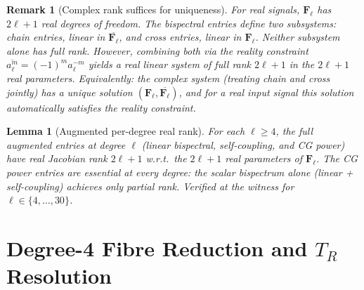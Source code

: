 \documentclass[11pt]{article}
\newtheorem{lemma}[theorem]{Lemma}
\newtheorem{remark}[theorem]{Remark}
\newcommand{\conj}[1]{\overline{#1}}
\begin{document}
\begin{remark}[Complex rank suffices for uniqueness]\label{rem:complex-real}
For real signals, $\mathbf{F}_\ell$ has $2\ell+1$ real degrees of freedom.
The bispectral entries define two subsystems: chain entries, linear in
$\conj{\mathbf{F}_\ell}$, and cross entries, linear in $\mathbf{F}_\ell$.
Neither subsystem alone has full rank.
However, combining both via the reality constraint
$\conj{a_\ell^m} = (-1)^m a_\ell^{-m}$ yields a real linear system
of full rank $2\ell+1$ in the $2\ell+1$ real parameters.
Equivalently: the complex system (treating chain and cross jointly)
has a unique solution $(\mathbf{F}_\ell, \conj{\mathbf{F}_\ell})$,
and for a real input signal this solution automatically satisfies
the reality constraint.
\end{remark}

\begin{lemma}[Augmented per-degree real rank]\label{lem:augmented-perdegree}
For each $\ell \ge 4$, the full augmented entries at degree $\ell$
(linear bispectral, self-coupling, and CG power) have real Jacobian
rank $2\ell+1$ w.r.t.\ the $2\ell+1$ real parameters of $\mathbf{F}_\ell$.
The CG power entries are essential at every degree: the scalar
bispectrum alone (linear + self-coupling) achieves only partial rank.
Verified at the witness for $\ell \in \{4, \ldots, 30\}$.
\end{lemma}


\section{Degree-4 Fibre Reduction and $T_R$ Resolution}
\end{document}
